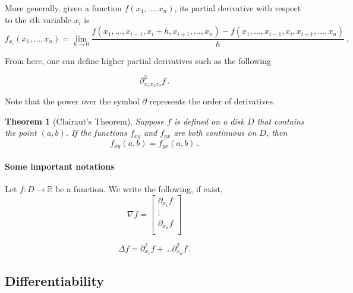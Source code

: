 \documentclass[
]{article}
\newtheorem{theorem}{Theorem}[section]
\theoremstyle{definition}
\theoremstyle{definition}
\theoremstyle{definition}
\theoremstyle{definition}
\theoremstyle{remark}
\begin{document}
More generally,
given a function \(f(x_1, \dots, x_n)\), its partial derivative with respect
to the \(i\)th variable \(x_i\) is
\begin{equation*}
    f_{x_i}(x_1, \dots, x_n) 
    = \lim_{h\to 0} \frac{ f(x_1, \dots, x_{i-1}, x_i + h , x_{i+1}, \dots, x_n) - f(x_1, \dots, x_{i-1}, x_i  , x_{i+1}, \dots, x_n)}{h} \,.
\end{equation*}

From here, one can define higher partial derivatives such as the following

\begin{equation*}
    \partial^3_{x_1 x_2 x_2}  f\,.
\end{equation*}

Note that the power over the symbol \(\partial\) represents the order of derivatives.

\begin{theorem}[Clairaut's Theorem]
Suppose \(f\) is defined on a disk \(D\) that contains the point \((a,b)\).
If the functions \(f_{xy}\) and \(f_{yx}\) are both continuous on \(D\), then
\begin{equation*}
    f_{xy}(a,b) = f_{yx}(a,b) \,.
\end{equation*}
\end{theorem}

\paragraph*{Some important notations}\label{some-important-notations}

Let \(f:D \to \mathbb{R}\) be a function. We write the following, if exist,
\begin{equation*}
    \nabla f = \begin{bmatrix}
        \partial_{x_1} f\\
        \vdots \\
        \partial_{x_n} f\\
    \end{bmatrix}
\end{equation*}

\begin{equation*}
    \Delta f = \partial_{x_1}^2 f + \dots \partial_{x_n}^2 f \,.
\end{equation*}

\subsection{Differentiability}\label{differentiability}
\end{document}

